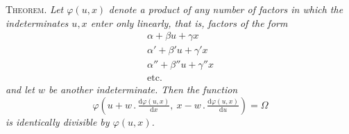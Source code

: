 \textsc{Theorem.} \textit{Let $\varphi(u,x)$}\textit{ denote a product of any number of factors in which the indeterminates $u,x$ enter only linearly, that is, factors of the form}
\[
\begin{gathered}
\alpha+\beta u+\gamma x\\
\alpha'+\beta'u+\gamma'x\\
\alpha''+\beta''u+\gamma''x\\
\text{etc.}
\end{gathered}
\]
\textit{and let $w$ be another indeterminate. Then the function}
\[
\varphi(u+w\, .\,\tfrac{\mathrm d\varphi(u,x)}{\mathrm dx},\ x-w\, .\,\tfrac{\mathrm d\varphi(u,x)}{\mathrm du})=\Omega
\]
\textit{is identically divisible by $\varphi(u,x)$.}



